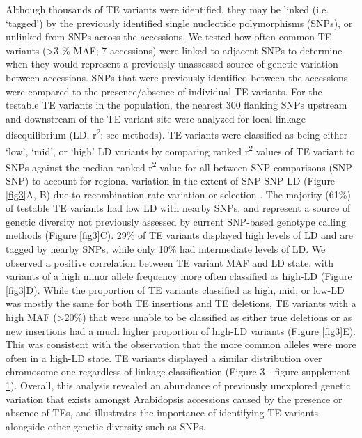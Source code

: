 \documentclass[12pt]{article}
\begin{document}
Although thousands of TE variants were identified, they may be linked
(i.e. `tagged') by the previously identified single nucleotide
polymorphisms (SNPs), or unlinked from SNPs across the accessions. We
tested how often common TE variants (\textgreater{}3 \% MAF; 7
accessions) were linked to adjacent SNPs to determine when they would
represent a previously unassessed source of genetic variation between
accessions. SNPs that were previously identified between the accessions
\cite{Schmitz:2013iu} were compared to the presence/absence of
individual TE variants. For the testable TE variants in the population,
the nearest 300 flanking SNPs upstream and downstream of the TE variant
site were analyzed for local linkage disequilibrium (LD, r\textsuperscript{2}; see
methods). TE variants were classified as being either `low', `mid', or
`high' LD variants by comparing ranked r\textsuperscript{2} values of TE variant to SNPs
against the median ranked r\textsuperscript{2} value for all between SNP comparisons
(SNP-SNP) to account for regional variation in the extent of SNP-SNP LD
(Figure \ref{fig3}A, B) due to recombination rate variation or selection
\cite{Horton:2012jh}. The majority (61\%) of testable TE variants had
low LD with nearby SNPs, and represent a source of genetic diversity not
previously assessed by current SNP-based genotype calling methods
(Figure \ref{fig3}C). 29\% of TE variants displayed high levels of LD and are
tagged by nearby SNPs, while only 10\% had intermediate levels of LD. We
observed a positive correlation between TE variant MAF and LD state,
with variants of a high minor allele frequency more often classified as
high-LD (Figure \ref{fig3}D). While the proportion of TE variants classified as
high, mid, or low-LD was mostly the same for both TE insertions and TE
deletions, TE variants with a high MAF (\textgreater{}20\%) that were
unable to be classified as either true deletions or as new insertions
had a much higher proportion of high-LD variants (Figure \ref{fig3}E). This was
consistent with the observation that the more common alleles were more
often in a high-LD state. TE variants displayed a similar distribution
over chromosome one regardless of linkage classification (Figure 3 -
figure supplement \hyperref[fig3s1]{1}). Overall, this analysis revealed an abundance of
previously unexplored genetic variation that exists amongst Arabidopsis
accessions caused by the presence or absence of TEs, and illustrates the
importance of identifying TE variants alongside other genetic diversity
such as SNPs.
\end{document}

